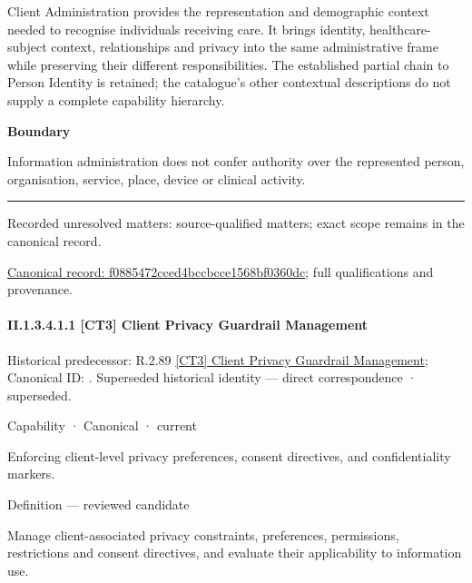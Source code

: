 Client Administration provides the representation and demographic context needed to recognise individuals receiving care. It brings identity, healthcare-subject context, relationships and privacy into the same administrative frame while preserving their different responsibilities. The established partial chain to Person Identity is retained; the catalogue's other contextual descriptions do not supply a complete capability hierarchy.



\textbf{Boundary}



Information administration does not confer authority over the represented person, organisation, service, place, device or clinical activity.



\medskip\hrule\medskip

{\small Recorded unresolved matters: source-qualified matters; exact scope remains in the canonical record.}\par
{\footnotesize \href{../../../../continuum/strategy/capability/f0885472cced4bccbcce1568bf0360dc.md}{Canonical record: f0885472cced4bccbcce1568bf0360dc}; full qualifications and provenance.}\par
\paragraph*{II.1.3.4.1.1 [CT3] Client Privacy Guardrail Management}
\label{navigation:II.1.3.4.1.1}

{\small Historical predecessor: R.2.89 \hyperref[element:d2e6078b5db041cb904e0cadcebce6eb]{[CT3] Client Privacy Guardrail Management}; Canonical ID: \texttt{}. Superseded historical identity — direct correspondence · superseded.}\par
\label{element:7577a6e1815243648dd5356c21cca151}
{\small Capability · Canonical · current}\par

Enforcing client-level privacy preferences, consent directives, and confidentiality markers.



Definition — reviewed candidate



Manage client-associated privacy constraints, preferences, permissions, restrictions and consent directives, and evaluate their applicability to information use.



